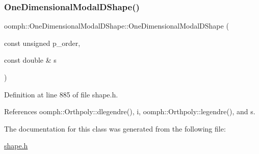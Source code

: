 \subsubsection{\texorpdfstring{One\+Dimensional\+Modal\+D\+Shape()}{OneDimensionalModalDShape()}}
{\footnotesize\ttfamily oomph\+::\+One\+Dimensional\+Modal\+D\+Shape\+::\+One\+Dimensional\+Modal\+D\+Shape (\begin{DoxyParamCaption}\item[{const unsigned}]{p\+\_\+order,  }\item[{const double \&}]{s }\end{DoxyParamCaption})\hspace{0.3cm}{\ttfamily [inline]}}



Definition at line 885 of file shape.\+h.



References oomph\+::\+Orthpoly\+::dlegendre(), i, oomph\+::\+Orthpoly\+::legendre(), and s.



The documentation for this class was generated from the following file\+:\begin{DoxyCompactItemize}
\item 
\hyperlink{shape_8h}{shape.\+h}\end{DoxyCompactItemize}
